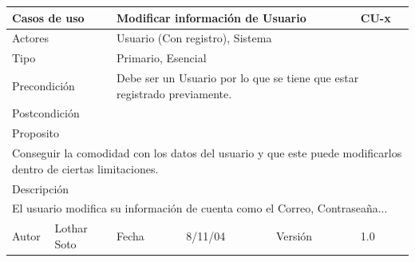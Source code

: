 \documentclass{article}
\begin{document}
\begin{table}[h]
\begin{tabular}{|l|l|l|l|l|l|}
\hline
\multicolumn{2}{|p{2cm}|}{Casos de uso}  & \multicolumn{3}{p{7cm}|}{Modificar información de Usuario} & CU-x \\
\hline
\multicolumn{2}{|p{2cm}|}{Actores}       & \multicolumn{4}{p{8cm}|}{Usuario (Con registro), Sistema}        \\
\hline
\multicolumn{2}{|p{2cm}|}{Tipo}          & \multicolumn{4}{p{8cm}|}{Primario, Esencial}        \\
\hline
\multicolumn{2}{|p{2cm}|}{Precondición}  & \multicolumn{4}{p{8cm}|}{Debe ser un Usuario por lo que se tiene que estar registrado previamente.}        \\
\hline
\multicolumn{2}{|p{2cm}|}{Postcondición} & \multicolumn{4}{p{8cm}|}{}        \\
\hline
\multicolumn{6}{|p{10cm}|}{Proposito}                                   \\
\hline
\multicolumn{6}{|p{10cm}|}{Conseguir la comodidad con los datos del usuario y que este puede modificarlos dentro de ciertas limitaciones.}                                            \\
\hline
\multicolumn{6}{|p{10cm}|}{Descripción}                                 \\
\hline
\multicolumn{6}{|p{10cm}|}{El usuario modifica su información de cuenta como el Correo, Contraseaña...}                                            \\
\hline
Autor              &     Lothar Soto         & Fecha    &  8/11/04   &   Versión  & 1.0\\     
\hline
\end{tabular}
\end{table}
\end{document}

